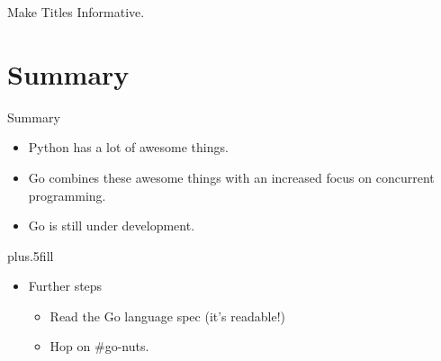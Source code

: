\documentclass{beamer}
\begin{document}
\begin{frame}{Make Titles Informative.}
\end{frame}



\section*{Summary}

\begin{frame}{Summary}

  \begin{itemize}
  \item
    Python has \alert{a lot of awesome things}.
  \item
    Go \alert{combines these awesome things} with an increased focus on concurrent programming.
  \item
    Go is still \alert{under development}.
  \end{itemize}
  
  \vskip0pt plus.5fill
  \begin{itemize}
  \item
      Further steps
    \begin{itemize}
    \item
        Read the Go language spec (it's readable!)
    \item
        Hop on \#go-nuts.
    \end{itemize}
  \end{itemize}
\end{frame}
\end{document}
